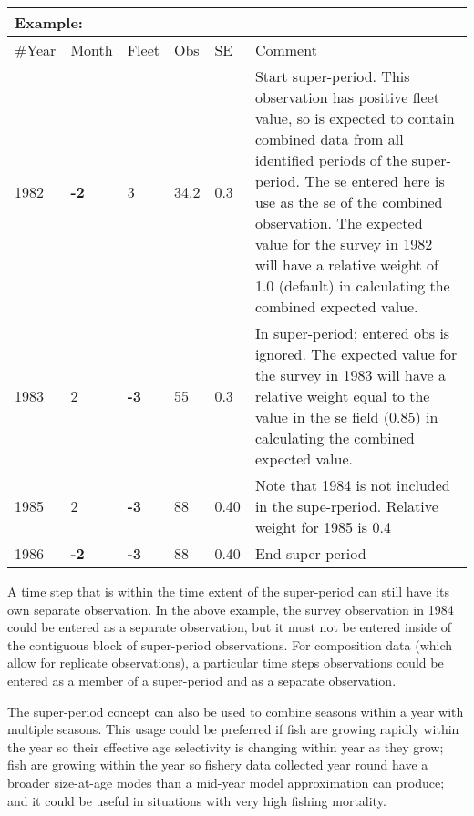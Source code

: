 \begin{center}
	\begin{tabular}{p{1cm} p{1cm} p{1cm} p{1cm} p{1cm} p{8cm}}
		\multicolumn{6}{l}{Example:}\\
		\hline
		\#Year & Month & Fleet & Obs & SE & Comment \\
		\hline
		1982 & \textbf{-2} & 3 & 34.2 & 0.3 & Start super-period.  This observation has positive fleet value, so is expected to contain combined data from all identified periods of the super-period.  The se entered here is use as the se of the combined observation.  The expected value for the survey in 1982 will have a relative weight of 1.0 (default) in calculating the combined expected value.\\
		\hline
		1983 & 2 & \textbf{-3} & 55 & 0.3 & In super-period; entered obs is ignored.  The expected value for the survey in 1983 will have a relative weight equal to the value in the se field (0.85) in calculating the combined expected value.\\
		\hline
		1985 & 2 & \textbf{-3}& 88 & 0.40 & Note that 1984 is not included in the supe-rperiod.  Relative weight for 1985 is 0.4\\
		\hline
		1986 & \textbf{-2} & \textbf{-3} & 88 & 0.40 & End super-period\\
		\hline
	\end{tabular}
\end{center}

A time step that is within the time extent of the super-period can still have its own separate observation.  In the above example, the survey observation in 1984 could be entered as a separate observation, but it must not be entered inside of the contiguous block of super-period observations.  For composition data (which allow for replicate observations), a particular time steps observations could be entered as a member of a super-period and as a separate observation.

The super-period concept can also be used to combine seasons within a year with multiple seasons.  This usage could be preferred if fish are growing rapidly within the year so their effective age selectivity is changing within year as they grow; fish are growing within the year so fishery data collected year round have a broader size-at-age modes than a mid-year model approximation can produce; and it could be useful in situations with very high fishing mortality.
